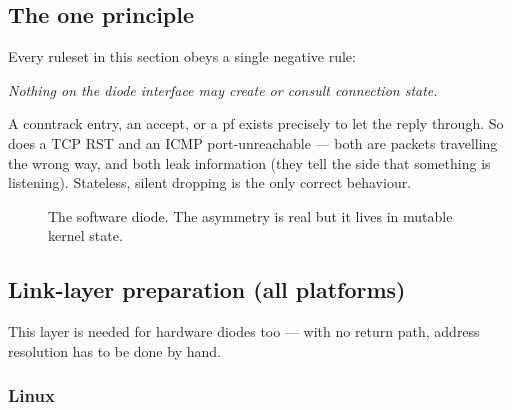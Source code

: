 \documentclass[11pt,a4paper]{article}
\begin{document}
\subsection{The one principle}

Every ruleset in this section obeys a single negative rule:

\begin{center}
\emph{Nothing on the diode interface may create or consult connection state.}
\end{center}

A conntrack entry, an  accept, or a pf
 exists precisely to let the reply through. So does a TCP RST
and an ICMP port-unreachable --- both are packets travelling the wrong way,
and both leak information (they tell the \dstside{} side that something is
listening). Stateless, silent dropping is the only correct behaviour.

\begin{figure}[h]
\centering
{}
\caption{The software diode. The asymmetry is real but it lives in mutable
         kernel state.}
\end{figure}

\subsection{Link-layer preparation (all platforms)}
\label{sec:linklayer}

This layer is needed for hardware diodes too --- with no return path, address
resolution has to be done by hand.

\subsubsection{Linux}
\end{document}
